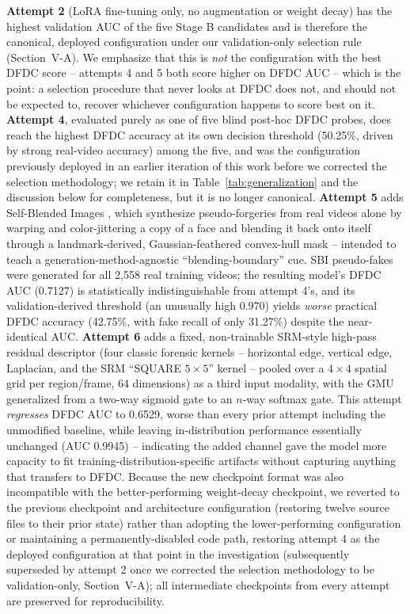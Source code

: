 \documentclass[conference]{IEEEtran}
\begin{document}
\textbf{Attempt 2} (LoRA fine-tuning only, no augmentation or weight decay)
has the highest validation AUC of the five Stage B candidates and is
therefore the canonical, deployed configuration under our validation-only
selection rule (Section~V-A). We emphasize that this is \emph{not} the
configuration with the best DFDC score -- attempts 4 and 5 both score higher
on DFDC AUC -- which is the point: a selection procedure that never looks at
DFDC does not, and should not be expected to, recover whichever
configuration happens to score best on it. \textbf{Attempt 4}, evaluated
purely as one of five blind post-hoc DFDC probes, does reach the highest
DFDC accuracy at its own decision threshold (50.25\%, driven by strong real-video
accuracy) among the five, and was the configuration previously deployed in
an earlier iteration of this work before we corrected the selection
methodology; we retain it in Table~\ref{tab:generalization} and the
discussion below for completeness, but it is no longer canonical.
\textbf{Attempt 5} adds Self-Blended Images
\cite{shiohara2022sbi}, which synthesize pseudo-forgeries from real videos
alone by warping and color-jittering a copy of a face and blending it back
onto itself through a landmark-derived, Gaussian-feathered convex-hull
mask -- intended to teach a generation-method-agnostic ``blending-boundary''
cue. SBI pseudo-fakes were generated for all 2{,}558 real training videos;
the resulting model's DFDC AUC (0.7127) is statistically indistinguishable
from attempt 4's, and its validation-derived threshold (an unusually high
0.970) yields \emph{worse} practical DFDC accuracy (42.75\%, with fake
recall of only 31.27\%) despite the near-identical AUC. \textbf{Attempt 6}
adds a fixed, non-trainable SRM-style high-pass residual descriptor (four
classic forensic kernels -- horizontal edge, vertical edge, Laplacian, and
the SRM ``SQUARE $5{\times}5$'' kernel \cite{fridrich2012srm} -- pooled over
a $4{\times}4$ spatial grid per region/frame, 64 dimensions) as a third
input modality, with the GMU generalized from a two-way sigmoid gate to an
$n$-way softmax gate. This attempt \emph{regresses} DFDC AUC to 0.6529,
worse than every prior attempt including the unmodified baseline, while
leaving in-distribution performance essentially unchanged (AUC 0.9945) --
indicating the added channel gave the model more capacity to fit
training-distribution-specific artifacts without capturing anything that
transfers to DFDC. Because the new checkpoint format was also incompatible
with the better-performing weight-decay checkpoint, we reverted to the
previous checkpoint and architecture configuration (restoring twelve
source files to their prior state) rather than adopting the
lower-performing configuration or maintaining a permanently-disabled code
path, restoring attempt 4 as the deployed configuration at that point in the
investigation (subsequently superseded by attempt 2 once we corrected the
selection methodology to be validation-only, Section~V-A); all intermediate
checkpoints from every attempt are preserved for reproducibility.
\end{document}
